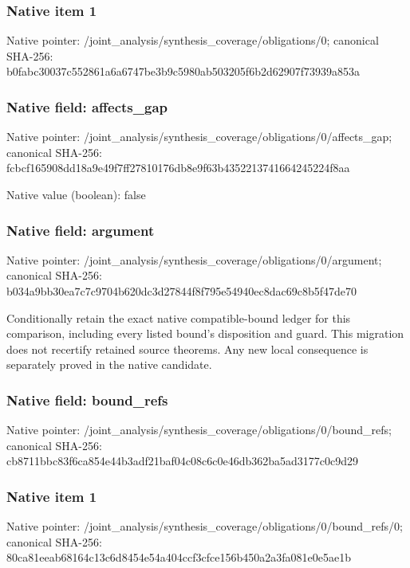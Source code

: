 \documentclass[10pt,a4paper]{article}
\begin{document}
\subsubsection{Native item 1}
Native pointer: /joint\_\allowbreak{}analysis/synthesis\_\allowbreak{}coverage/obligations/0; canonical SHA-256: b0fabc30037c552861a6a6747be3b9c5980ab503205f6b2d62907f73939a853a

\subsubsection{Native field: affects\_\allowbreak{}gap}
Native pointer: /joint\_\allowbreak{}analysis/synthesis\_\allowbreak{}coverage/obligations/0/affects\_\allowbreak{}gap; canonical SHA-256: fcbcf165908dd18a9e49f7ff27810176db8e9f63b4352213741664245224f8aa

Native value (boolean): false

\subsubsection{Native field: argument}
Native pointer: /joint\_\allowbreak{}analysis/synthesis\_\allowbreak{}coverage/obligations/0/argument; canonical SHA-256: b034a9bb30ea7c7c9704b620dc3d27844f8f795e54940ec8dac69c8b5f47de70

\begingroup\raggedright\sloppy Conditionally retain the exact native compatible-bound ledger for this comparison,\allowbreak{} including every listed bound's disposition and guard. This migration does not recertify retained source theorems. Any new local consequence is separately proved in the native candidate.\par\endgroup

\subsubsection{Native field: bound\_\allowbreak{}refs}
Native pointer: /joint\_\allowbreak{}analysis/synthesis\_\allowbreak{}coverage/obligations/0/bound\_\allowbreak{}refs; canonical SHA-256: cb8711bbc83f6ca854e44b3adf21baf04c08c6c0e46db362ba5ad3177c0c9d29

\subsubsection{Native item 1}
Native pointer: /joint\_\allowbreak{}analysis/synthesis\_\allowbreak{}coverage/obligations/0/bound\_\allowbreak{}refs/0; canonical SHA-256: 80ca81eeab68164c13c6d8454e54a404ccf3cfce156b450a2a3fa081e0e5ae1b
\end{document}
